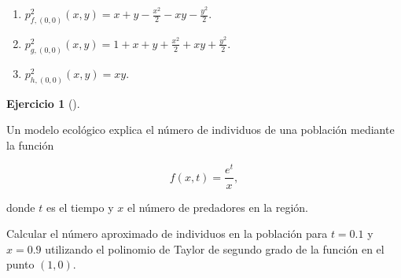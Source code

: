 \documentclass[
  spanish,
  a4paper,
]{scrreport}
\theoremstyle{definition}
\newtheorem{exercise}{Ejercicio}[chapter]
\theoremstyle{remark}
\begin{document}
\begin{tcolorbox}[enhanced jigsaw, arc=.35mm, bottomrule=.15mm, bottomtitle=1mm, breakable, colback=white, colbacktitle=quarto-callout-tip-color!10!white, colframe=quarto-callout-tip-color-frame, coltitle=black, left=2mm, leftrule=.75mm, opacityback=0, opacitybacktitle=0.6, rightrule=.15mm, title=\textcolor{quarto-callout-tip-color}{\faLightbulb}\hspace{0.5em}{Solución}, titlerule=0mm, toprule=.15mm, toptitle=1mm]

\begin{enumerate}
\def\labelenumi{\alph{enumi}.}
\item
  \(p^2_{f,(0,0)}(x,y) = x + y -\frac{x^2}{2} - xy -\frac{y^2}{2}\).
\item
  \(p^2_{g,(0,0)}(x,y) = 1 + x + y +\frac{x^2}{2} + xy +\frac{y^2}{2}\).
\item
  \(p^2_{h,(0,0)}(x,y) = xy\).
\end{enumerate}

\end{tcolorbox}

\begin{exercise}[]\protect\hypertarget{exr-polinomio-taylor-modelo-ecologico}{}\label{exr-polinomio-taylor-modelo-ecologico}

Un modelo ecológico explica el número de individuos de una población
mediante la función

\[f(x,t)=\dfrac{e^t}{x},\]

donde \(t\) es el tiempo y \(x\) el número de predadores en la región.

Calcular el número aproximado de individuos en la población para
\(t=0.1\) y \(x=0.9\) utilizando el polinomio de Taylor de segundo grado
de la función en el punto \((1,0)\).

\end{exercise}
\end{document}
